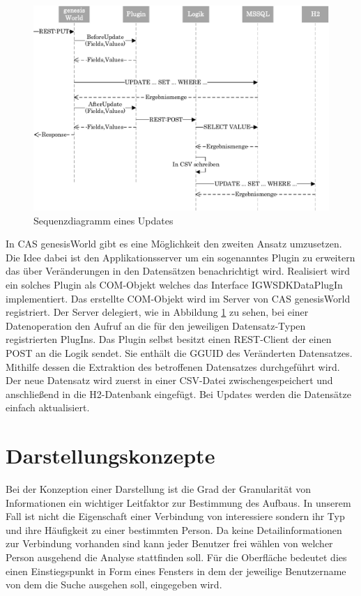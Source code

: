 \begin{figure}[htbp]
\centering
  \includegraphics[width=1.0\textwidth, width=1.0\textwidth]{pics/sequenzdiagramm.pdf}
\caption{Sequenzdiagramm eines Updates}
\label{konzept_sequenz}
\end{figure}

In CAS genesisWorld gibt es eine Möglichkeit den zweiten Ansatz umzusetzen. Die Idee dabei ist den Applikationsserver um ein sogenanntes Plugin zu erweitern das über Veränderungen in den Datensätzen benachrichtigt wird. Realisiert wird ein solches Plugin als COM-Objekt welches das Interface IGWSDKDataPlugIn implementiert. Das erstellte COM-Objekt wird im Server von CAS genesisWorld registriert. Der Server delegiert, wie in Abbildung \ref{konzept_sequenz} zu sehen, bei einer Datenoperation den Aufruf an die für den jeweiligen Datensatz-Typen registrierten PlugIns. Das Plugin selbst besitzt einen REST-Client der einen POST an die Logik sendet. Sie enthält die GGUID des Veränderten Datensatzes. Mithilfe dessen die Extraktion des betroffenen Datensatzes durchgeführt wird. Der neue Datensatz wird zuerst in einer CSV-Datei zwischengespeichert und anschließend in die H2-Datenbank eingefügt. Bei Updates werden die Datensätze einfach aktualisiert. 

\section{Darstellungskonzepte}
\label{ch:Konzeption:sec:Darstellungskonzepte}

Bei der Konzeption einer Darstellung ist die Grad der Granularität von Informationen ein wichtiger Leitfaktor zur Bestimmung des Aufbaus. In unserem Fall ist nicht die Eigenschaft einer Verbindung von interessiere sondern ihr Typ und ihre Häufigkeit zu einer bestimmten Person. Da keine Detailinformationen zur Verbindung vorhanden sind kann jeder Benutzer frei wählen von welcher Person ausgehend die Analyse stattfinden soll. Für die Oberfläche bedeutet dies einen Einstiegspunkt in Form eines Fensters in dem der jeweilige Benutzername von dem die Suche ausgehen soll, eingegeben wird.

